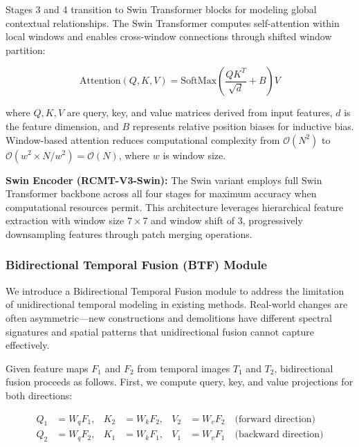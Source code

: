 \documentclass[journal]{IEEEtran}
\begin{document}
Stages 3 and 4 transition to Swin Transformer blocks for modeling global contextual relationships. The Swin Transformer computes self-attention within local windows and enables cross-window connections through shifted window partition:

\begin{equation}
\text{Attention}(Q, K, V) = \text{SoftMax}\left(\frac{QK^T}{\sqrt{d}} + B\right)V
\label{eq:attention}
\end{equation}

where $Q, K, V$ are query, key, and value matrices derived from input features, $d$ is the feature dimension, and $B$ represents relative position biases for inductive bias. Window-based attention reduces computational complexity from $\mathcal{O}(N^2)$ to $\mathcal{O}(w^2 \times N/w^2) = \mathcal{O}(N)$, where $w$ is window size.

\textbf{Swin Encoder (RCMT-V3-Swin):} The Swin variant employs full Swin Transformer backbone across all four stages for maximum accuracy when computational resources permit. This architecture leverages hierarchical feature extraction with window size $7 \times 7$ and window shift of 3, progressively downsampling features through patch merging operations.

\subsubsection{Bidirectional Temporal Fusion (BTF) Module}

We introduce a Bidirectional Temporal Fusion module to address the limitation of unidirectional temporal modeling in existing methods. Real-world changes are often asymmetric—new constructions and demolitions have different spectral signatures and spatial patterns that unidirectional fusion cannot capture effectively.

Given feature maps $F_1$ and $F_2$ from temporal images $T_1$ and $T_2$, bidirectional fusion proceeds as follows. First, we compute query, key, and value projections for both directions:

\begin{equation}
\begin{aligned}
Q_1 &= W_q F_1, & K_2 &= W_k F_2, & V_2 &= W_v F_2 \quad \text{(forward direction)} \\
Q_2 &= W_q F_2, & K_1 &= W_k F_1, & V_1 &= W_v F_1 \quad \text{(backward direction)}
\end{aligned}
\label{eq:qkv}
\end{equation}
\end{document}
